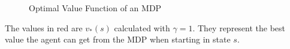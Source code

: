 \begin{figure}[H]
\begin{tikzpicture}[x=0.75pt,y=0.75pt,yscale=-1,xscale=1]
\end{tikzpicture}
\caption{Optimal Value Function of an MDP}
\label{optimalvaluefunction}
\end{figure}

The values in red are $v_*(s)$ calculated with $\gamma = 1$. They represent the best value the agent can get from the MDP when starting in state $s$.

\begin{figure}[H]
\centering




\begin{tikzpicture}[x=0.75pt,y=0.75pt,yscale=-1,xscale=1]


\end{tikzpicture}
\end{figure}
